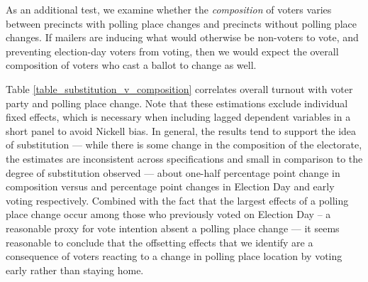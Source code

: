 \documentclass{cup_PSRM}
\begin{document}
As an additional test, we examine whether the \emph{composition} of voters varies between precincts with polling place changes and precincts without polling place changes.  If mailers are inducing what would otherwise be non-voters to vote, and preventing election-day voters from voting, then we would expect the overall composition of voters who cast a ballot to change as well.

Table \ref{table_substitution_v_composition} correlates overall turnout with voter party and polling place change. Note that these estimations exclude individual fixed effects, which is necessary when including lagged dependent variables in a short panel to avoid Nickell bias.  In general, the results tend to support the idea of substitution --- while there is some change in the composition of the electorate, the estimates are inconsistent across specifications and small in comparison to the degree of substitution observed --- about one-half percentage point change in composition versus  and  percentage point changes in Election Day and early voting respectively. Combined with the fact that the largest effects of a polling place change occur among those who previously voted on Election Day -- a reasonable proxy for vote intention absent a polling place change --- it seems reasonable to conclude that the offsetting effects that we identify are a consequence of voters reacting to a change in polling place location by voting early rather than staying home.
\end{document}
